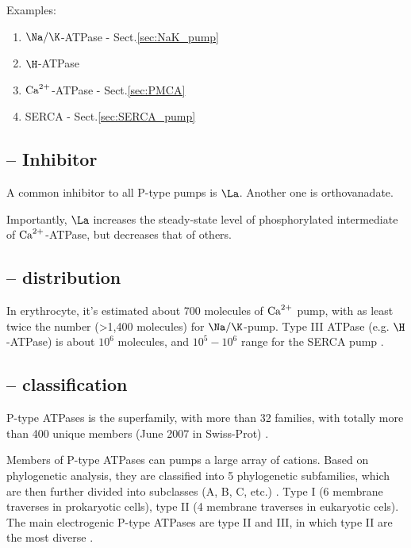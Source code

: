Examples:
\begin{enumerate}
  \item $\Na/\K$-ATPase - Sect.\ref{sec:NaK_pump}
  \item $\H$-ATPase 
  \item ${\text{Ca}^{2+}}$-ATPase - Sect.\ref{sec:PMCA}
  \item SERCA - Sect.\ref{sec:SERCA_pump}
\end{enumerate}



\subsection{-- Inhibitor}
\label{sec:P-ATPase-inhibitor}

A common inhibitor to all P-type pumps is $\La$. Another one is orthovanadate.

Importantly, $\La$  increases the steady-state level of phosphorylated
intermediate of ${\text{Ca}^{2+}}$-ATPase, but decreases that of others.

\subsection{-- distribution}
\label{sec:P-ATPase-distribution}

In erythrocyte, it's estimated about 700 molecules of ${\text{Ca}^{2+}}$ pump, with as least
twice the number (>1,400 molecules) for $\Na/\K$-pump. Type III ATPase (e.g.
$\H$-ATPase) is about $10^6$ molecules, and $10^5-10^6$ range for the SERCA pump
\citep{carafoli1994}.

\subsection{-- classification}
\label{sec:P-ATPase-classification}

P-type ATPases is the superfamily, with more than 32 families, with totally more
than 400 unique members (June 2007 in Swiss-Prot) \citep{bublitz2011}. 

Members of P-type ATPases can pumps a large array of cations. Based on
phylogenetic analysis, they are classified into 5 phylogenetic subfamilies,
which are then further divided into subclasses (A, B, C, etc.)
\citep{axelsen1998}. Type I (6 membrane traverses in prokaryotic cells), type II
(4 membrane traverses in eukaryotic cels). The main electrogenic P-type ATPases
are type II and III, in which type II are the most diverse
\citep{kuhlbrandt2004}.

